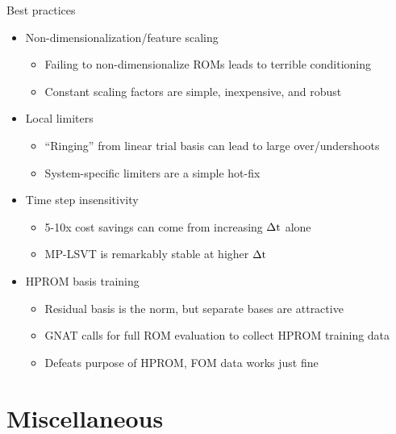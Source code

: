 \documentclass[]{beamer}
\begin{document}
\begin{frame}{Best practices}
	\begin{itemize}
		\item Non-dimensionalization/feature scaling
		\begin{itemize}
			\item Failing to non-dimensionalize ROMs leads to terrible conditioning
			\item Constant scaling factors are simple, inexpensive, and robust
		\end{itemize}
		\item Local limiters
		\begin{itemize}
			\item ``Ringing'' from linear trial basis can lead to large over/undershoots
			\item System-specific limiters are a simple hot-fix
		\end{itemize}
		\item Time step insensitivity
		\begin{itemize}
			\item 5-10x cost savings can come from increasing $\Delta \text{t}$ alone
			\item MP-LSVT is remarkably stable at higher $\Delta \text{t}$
		\end{itemize}
		\item HPROM basis training
		\begin{itemize}
			\item Residual basis is the norm, but separate bases are attractive
			\item GNAT calls for full ROM evaluation to collect HPROM training data
			\item Defeats purpose of HPROM, FOM data works just fine
		\end{itemize}
	\end{itemize}
\end{frame}

\section*{Miscellaneous}
\end{document}
